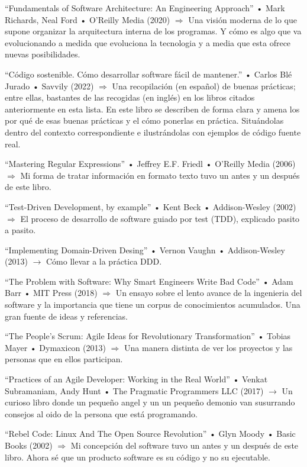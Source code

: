 \documentclass[spanish,12pt,a4paper,final,oneside]{book}
\begin{document}
``Fundamentals of Software Architecture: An Engineering Approach'' • Mark Richards, Neal Ford • O'Reilly Media (2020) $\Rightarrow$ Una visión moderna de lo que supone organizar la arquitectura interna de los programas. Y cómo es algo que va evolucionando a medida que evoluciona la tecnologia y a media que esta ofrece nuevas posibilidades.

``Código sostenible. Cómo desarrollar software fácil de mantener.'' • Carlos Blé Jurado • Savvily (2022) $\Rightarrow$ Una recopilación  (en español) de buenas prácticas; entre ellas, bastantes de las recogidas (en inglés) en los libros citados anteriormente en esta lista. En este libro se describen de forma clara y amena los por qué de esas buenas prácticas y el cómo ponerlas en práctica. Situándolas dentro del contexto correspondiente e ilustrándolas con ejemplos de código fuente real.

``Mastering Regular Expressions'' • Jeffrey E.F. Friedl • O'Reilly Media (2006) $\Rightarrow$ Mi forma de tratar información en formato texto tuvo un antes y un después de este libro.

``Test-Driven Development, by example'' • Kent Beck • Addison-Wesley (2002) $\Rightarrow$ El proceso de desarrollo de software guiado por test (TDD), explicado pasito a pasito.

``Implementing Domain-Driven Desing'' • Vernon Vaughn • Addison-Wesley (2013) $\rightarrow$ Cómo llevar a la práctica DDD.

``The Problem with Software: Why Smart Engineers Write Bad Code'' • Adam Barr • MIT Press (2018) $\Rightarrow$ Un ensayo sobre el lento avance de la ingenieria del software y la importancia que tiene un corpus de conocimientos acumulados. Una gran fuente de ideas y referencias. 

``The People's Scrum: Agile Ideas for Revolutionary Transformation'' • Tobias Mayer • Dymaxicon (2013) $\Rightarrow$ Una manera distinta de ver los proyectos y las personas que en ellos participan. 

``Practices of an Agile Developer: Working in the Real World'' • Venkat Subramaniam, Andy Hunt • The Pragmatic Programmers LLC (2017) $\rightarrow$ Un curioso libro donde un pequeño angel y un un pequeño demonio van susurrando consejos al oido de la persona que está programando.

``Rebel Code: Linux And The Open Source Revolution'' • Glyn Moody • Basic Books (2002) $\Rightarrow$ Mi concepción del software tuvo un antes y un después de este libro. Ahora sé que un producto software es su código y no su ejecutable.
\end{document}
